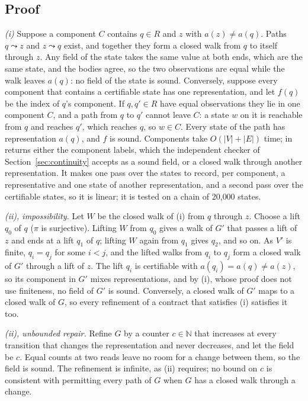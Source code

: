 \subsection{Proof}
\emph{(i)} Suppose a component $C$ contains $q\in R$ and $z$ with $a(z)\ne a(q)$.
Paths $q\leadsto z$ and $z\leadsto q$ exist, and together they form a closed
walk from $q$ to itself through $z$. Any field of the state takes the same
value at both ends, which are the same state, and the bodies agree, so the two
observations are equal while the walk leaves $a(q)$: no field of the state is
sound. Conversely, suppose every component that contains a certifiable state
has one representation, and let $f(q)$ be the index of $q$'s component. If
$q,q'\in R$ have equal observations they lie in one component $C$, and a path
from $q$ to $q'$ cannot leave $C$: a state $w$ on it is reachable from $q$ and
reaches $q'$, which reaches $q$, so $w\in C$. Every state of the path has
representation $a(q)$, and $f$ is sound. Components take $O(|V|+|E|)$ time;
 in  returns either the component
labels, which the independent checker of Section~\ref{sec:continuity} accepts
as a sound field, or a closed walk through another representation. It makes
one pass over the states to record, per component, a representative and one
state of another representation, and a second pass over the certifiable
states, so it is linear; it is tested on a chain of 20{,}000 states.

\emph{(ii), impossibility.} Let $W$ be the closed walk of (i) from $q$ through
$z$. Choose a lift $q_0$ of $q$ ($\pi$ is surjective). Lifting $W$ from $q_0$
gives a walk of $G'$ that passes a lift of $z$ and ends at a lift $q_1$ of $q$;
lifting $W$ again from $q_1$ gives $q_2$, and so on. As $V'$ is finite,
$q_i=q_j$ for some $i<j$, and the lifted walks from $q_i$ to $q_j$ form a closed
walk of $G'$ through a lift of $z$. The lift $q_i$ is certifiable with
$a(q_i)=a(q)\ne a(z)$, so its component in $G'$ mixes representations, and by
(i), whose proof does not use finiteness, no field of $G'$ is sound.
Conversely, a closed walk of $G'$ maps to a closed walk of $G$, so every
refinement of a contract that satisfies (i) satisfies it too.

\emph{(ii), unbounded repair.} Refine $G$ by a counter $c\in\mathbb{N}$ that
increases at every transition that changes the representation and never
decreases, and let the field be $c$. Equal counts at two reads leave no room
for a change between them, so the field is sound. The refinement is infinite,
as (ii) requires; no bound on $c$ is consistent with permitting every path of
$G$ when $G$ has a closed walk through a change.

